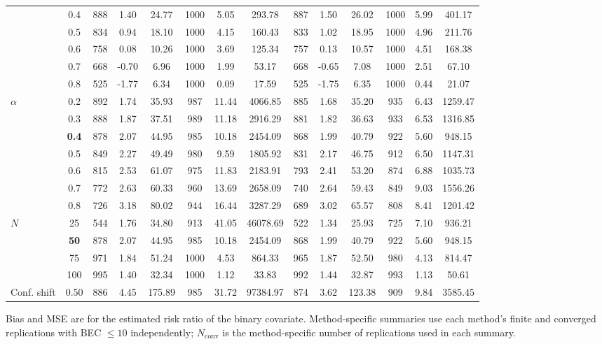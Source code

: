 \begin{table}[htbp]
\begin{tabular}{l c *{4}{S[table-format=4.0] S[table-format=-2.2] S[table-format=5.2]}}
 & 0.4 & 888 & 1.40 & 24.77 & 1000 & 5.05 & 293.78 & 887 & 1.50 & 26.02 & 1000 & 5.99 & 401.17 \\
 & 0.5 & 834 & 0.94 & 18.10 & 1000 & 4.15 & 160.43 & 833 & 1.02 & 18.95 & 1000 & 4.96 & 211.76 \\
 & 0.6 & 758 & 0.08 & 10.26 & 1000 & 3.69 & 125.34 & 757 & 0.13 & 10.57 & 1000 & 4.51 & 168.38 \\
 & 0.7 & 668 & -0.70 & 6.96 & 1000 & 1.99 & 53.17 & 668 & -0.65 & 7.08 & 1000 & 2.51 & 67.10 \\
 & 0.8 & 525 & -1.77 & 6.34 & 1000 & 0.09 & 17.59 & 525 & -1.75 & 6.35 & 1000 & 0.44 & 21.07 \\
\midrule
$\alpha$ & 0.2 & 892 & 1.74 & 35.93 & 987 & 11.44 & 4066.85 & 885 & 1.68 & 35.20 & 935 & 6.43 & 1259.47 \\
 & 0.3 & 888 & 1.87 & 37.51 & 989 & 11.18 & 2916.29 & 881 & 1.82 & 36.63 & 933 & 6.53 & 1316.85 \\
 & \textbf{0.4} & 878 & 2.07 & 44.95 & 985 & 10.18 & 2454.09 & 868 & 1.99 & 40.79 & 922 & 5.60 & 948.15 \\
 & 0.5 & 849 & 2.27 & 49.49 & 980 & 9.59 & 1805.92 & 831 & 2.17 & 46.75 & 912 & 6.50 & 1147.31 \\
 & 0.6 & 815 & 2.53 & 61.07 & 975 & 11.83 & 2183.91 & 793 & 2.41 & 53.20 & 874 & 6.88 & 1035.73 \\
 & 0.7 & 772 & 2.63 & 60.33 & 960 & 13.69 & 2658.09 & 740 & 2.64 & 59.43 & 849 & 9.03 & 1556.26 \\
 & 0.8 & 726 & 3.18 & 80.02 & 944 & 16.44 & 3287.29 & 689 & 3.02 & 65.57 & 808 & 8.41 & 1201.42 \\
\midrule
$N$ & 25 & 544 & 1.76 & 34.80 & 913 & 41.05 & 46078.69 & 522 & 1.34 & 25.93 & 725 & 7.10 & 936.21 \\
 & \textbf{50} & 878 & 2.07 & 44.95 & 985 & 10.18 & 2454.09 & 868 & 1.99 & 40.79 & 922 & 5.60 & 948.15 \\
 & 75 & 971 & 1.84 & 51.24 & 1000 & 4.53 & 864.33 & 965 & 1.87 & 52.50 & 980 & 4.13 & 814.47 \\
 & 100 & 995 & 1.40 & 32.34 & 1000 & 1.12 & 33.83 & 992 & 1.44 & 32.87 & 993 & 1.13 & 50.61 \\
\midrule
Conf. shift & 0.50 & 886 & 4.45 & 175.89 & 985 & 31.72 & 97384.97 & 874 & 3.62 & 123.38 & 909 & 9.84 & 3585.45 \\
\bottomrule
\end{tabular}
\begin{flushleft}
\footnotesize Bias and MSE are for the estimated risk ratio of the binary covariate. Method-specific summaries use each method's finite and converged replications with BEC $\leq 10$ independently; $N_{\mathrm{conv}}$ is the method-specific number of replications used in each summary.
\end{flushleft}
\end{table}
